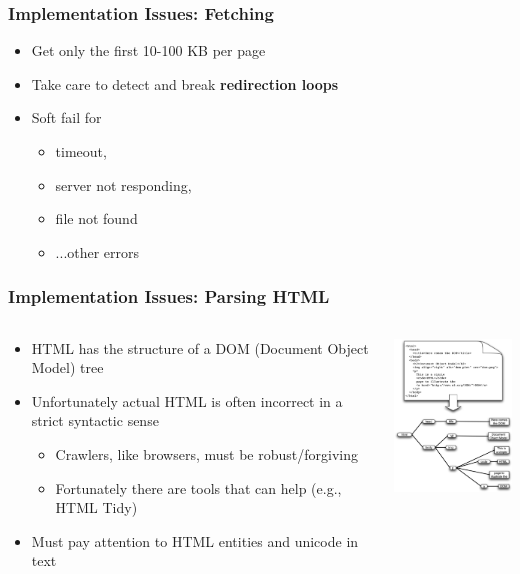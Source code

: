 \documentclass{beamer}
\begin{document}
\begin{frame} \frametitle{Implementation Issues: Fetching}
\begin{itemize}
\item  Get only the first 10-100 KB per page

\item Take care to detect and break {\bf redirection loops}

\item Soft fail for 
\begin{itemize}
\item timeout, 
\item server not responding,
\item file not found
\item ...other errors
\end{itemize}

\end{itemize}

\end{frame}


\begin{frame} \frametitle{Implementation Issues: Parsing HTML}

\begin{columns}[T]
\begin{column}{0.5\textwidth}
\begin{itemize}

\item HTML has the structure of a DOM (Document Object Model) tree

\item Unfortunately actual HTML is often incorrect in a strict syntactic sense
\begin{itemize}
\item Crawlers, like browsers, must be robust/forgiving
\item Fortunately there are tools that can help (e.g., HTML Tidy)
\end{itemize}
\item Must pay attention to HTML entities and unicode in text

\end{itemize}
\end{column}

\begin{column}{.5\textwidth}
      \includegraphics[width=4cm]{crawler-parsing}
\end{column}

\end{columns}

\end{frame}
\end{document}
